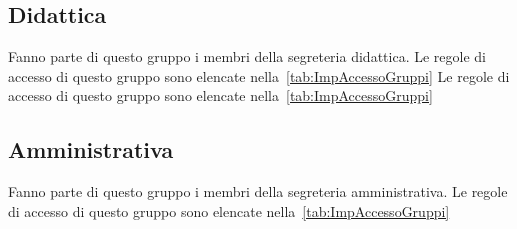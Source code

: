 \subsection{Didattica}
Fanno parte di questo gruppo i membri della segreteria didattica. Le  regole di accesso di questo gruppo sono elencate nella~\cref{tab:ImpAccessoGruppi}
Le  regole di accesso di questo gruppo sono elencate nella~\cref{tab:ImpAccessoGruppi}
\subsection{Amministrativa}
Fanno parte di questo gruppo i membri della segreteria amministrativa. Le  regole di accesso di questo gruppo sono elencate nella~\cref{tab:ImpAccessoGruppi}
